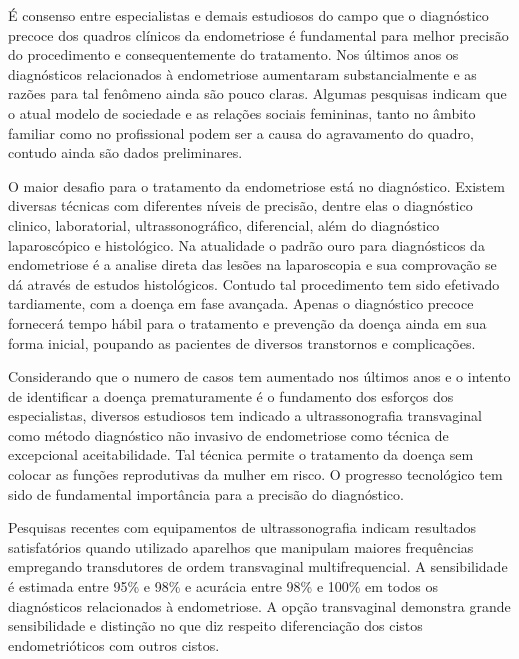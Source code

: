 \documentclass[12pt]{article} %
\begin{document}
É consenso entre especialistas e demais estudiosos do campo que o diagnóstico precoce dos quadros clínicos da endometriose é fundamental para melhor precisão do procedimento e consequentemente do tratamento. Nos últimos anos os diagnósticos relacionados à endometriose aumentaram substancialmente e as razões para tal fenômeno ainda são pouco claras. Algumas pesquisas indicam que o atual modelo de sociedade e as relações sociais femininas, tanto no âmbito familiar como no profissional podem ser a causa do agravamento do quadro, contudo ainda são dados preliminares.

O maior desafio para o tratamento da endometriose está no diagnóstico. Existem diversas técnicas com diferentes níveis de precisão, dentre elas o diagnóstico clinico, laboratorial, ultrassonográfico, diferencial, além do diagnóstico laparoscópico e histológico.  Na atualidade o padrão ouro para diagnósticos da endometriose é a analise direta das lesões na laparoscopia e sua comprovação se dá através de estudos histológicos. Contudo tal procedimento tem sido efetivado tardiamente, com a doença em fase avançada. Apenas o diagnóstico precoce fornecerá tempo hábil para o tratamento e prevenção da doença ainda em sua forma inicial, poupando as pacientes de diversos transtornos e complicações.

Considerando que o numero de casos tem aumentado nos últimos anos e o intento de
identificar a doença prematuramente é o fundamento dos esforços dos especialistas, diversos estudiosos tem indicado a ultrassonografia transvaginal como método diagnóstico não invasivo de endometriose como técnica de excepcional aceitabilidade.  Tal técnica permite o tratamento da doença sem colocar as funções reprodutivas da mulher em risco. O progresso tecnológico tem sido de fundamental importância para a precisão do diagnóstico.

Pesquisas recentes com equipamentos de ultrassonografia indicam resultados satisfatórios quando utilizado aparelhos que manipulam maiores frequências empregando transdutores de ordem transvaginal multifrequencial. A sensibilidade é estimada entre 95\% e 98\% e acurácia entre 98\% e 100\% em todos os diagnósticos relacionados à endometriose. A opção transvaginal demonstra grande sensibilidade e distinção no que diz respeito diferenciação dos cistos endometrióticos com outros cistos.
\end{document}
